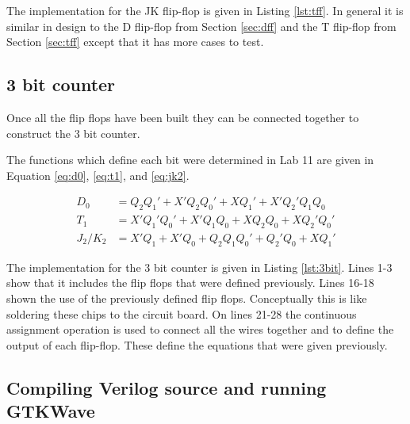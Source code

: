 \documentclass[12pt]{article}
\begin{document}
The implementation for the JK flip-flop is given in Listing \ref{lst:tff}.
In general it is similar in design to the D flip-flop from Section \ref{sec:dff}
and the T flip-flop from Section \ref{sec:tff} except that it has more
cases to test.



\subsection{3 bit counter}

Once all the flip flops have been built they can be connected
together to construct the 3 bit counter.

The functions which define each bit were determined in
Lab 11\cite{mahler144lab11} are given in Equation \ref{eq:d0},
\ref{eq:t1}, and \ref{eq:jk2}.

\begin{align}
	D_0 &= Q_2 Q_1' + X' Q_2 Q_0' + X Q_1' + X' Q_2' Q_1 Q_0 \label{eq:d0} \\
	T_1 &= X' Q_1' Q_0' + X' Q_1 Q_0 + X Q_2 Q_0 + X Q_2' Q_0' \label{eq:t1} \\
	J_2/K_2 &= X' Q_1 + X' Q_0 + Q_2 Q_1 Q_0' + Q_2' Q_0 + X Q_1' \label{eq:jk2}
\end{align}

The implementation for the 3 bit counter is given in Listing \ref{lst:3bit}.
Lines 1-3 show that it includes the flip flops that were defined previously.
Lines 16-18 shown the use of the previously defined flip flops.
Conceptually this is like soldering these chips to the circuit board.
On lines 21-28 the continuous assignment operation is used to connect
all the wires together and to define the output of each flip-flop.
These define the equations that were given previously.




\subsection{Compiling Verilog source and running GTKWave}
\end{document}
